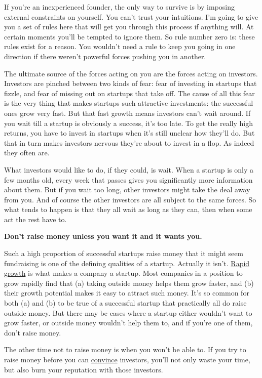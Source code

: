 If you're an inexperienced founder, the only way to survive is by
imposing external constraints on yourself. You can't trust your
intuitions. I'm going to give you a set of rules here that will get you
through this process if anything will. At certain moments you'll be
tempted to ignore them. So rule number zero is: these rules exist for a
reason. You wouldn't need a rule to keep you going in one direction if
there weren't powerful forces pushing you in another.

The ultimate source of the forces acting on you are the forces acting on
investors. Investors are pinched between two kinds of fear: fear of
investing in startups that fizzle, and fear of missing out on startups
that take off. The cause of all this fear is the very thing that makes
startups such attractive investments: the successful ones grow very
fast. But that fast growth means investors can't wait around. If you
wait till a startup is obviously a success, it's too late. To get the
really high returns, you have to invest in startups when it's still
unclear how they'll do. But that in turn makes investors nervous they're
about to invest in a flop. As indeed they often are.

What investors would like to do, if they could, is wait. When a startup
is only a few months old, every week that passes gives you significantly
more information about them. But if you wait too long, other investors
might take the deal away from you. And of course the other investors are
all subject to the same forces. So what tends to happen is that they all
wait as long as they can, then when some act the rest have to.

\textbf{Don't raise money unless you want it and it wants you.}

Such a high proportion of successful startups raise money that it might
seem fundraising is one of the defining qualities of a startup. Actually
it isn't. \href{growth.html}{Rapid growth} is what makes a company a
startup. Most companies in a position to grow rapidly find that (a)
taking outside money helps them grow faster, and (b) their growth
potential makes it easy to attract such money. It's so common for both
(a) and (b) to be true of a successful startup that practically all do
raise outside money. But there may be cases where a startup either
wouldn't want to grow faster, or outside money wouldn't help them to,
and if you're one of them, don't raise money.

The other time not to raise money is when you won't be able to. If you
try to raise money before you can \href{convince.html}{convince}
investors, you'll not only waste your time, but also burn your
reputation with those investors.

